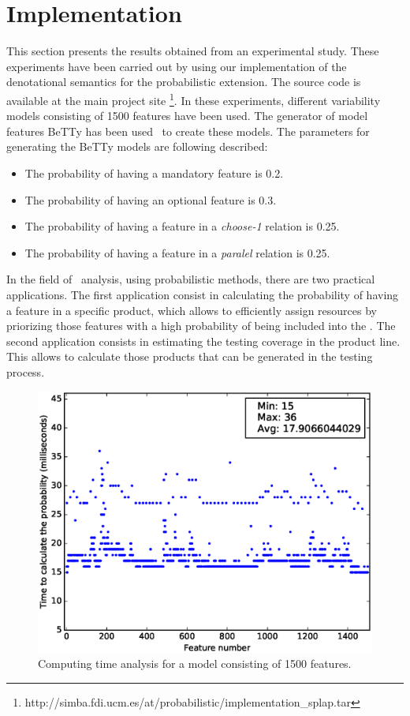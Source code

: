 
\section{Implementation}
\label{sec:stat:impl}

This section presents the results obtained from an experimental study. These experiments have
been carried out by using our implementation of the denotational semantics for the probabilistic 
extension. The source code is available at the main project site \footnote{http://simba.fdi.ucm.es/at/probabilistic/implementation\_splap.tar}.
In these experiments, different variability models consisting of 1500 features have been used. The generator of model features BeTTy has been used~\cite{SeguraHBC11} to create these models. The parameters for generating the BeTTy models are following 
described:

\begin{itemize}
	\item The probability of having a mandatory feature is 0.2.
	\item The probability of having an optional feature is 0.3.
	\item The probability of having a feature in a \emph{choose-1} relation is 0.25.
	\item The probability of having a feature in a \emph{paralel} relation is 0.25.
\end{itemize}

In the field of \SPLs\ analysis, using probabilistic methods, there are two practical applications. The first
application consist in calculating the probability of having a feature in a specific product, which allows to 
efficiently assign resources by priorizing those features with a high probability of being included into 
the \SPL. The second application consists in estimating the testing coverage in the product line. This 
allows to calculate those products that can be generated in the testing process.

\begin{figure}[h]
	\centering
	\linefigure
	\includegraphics[width=0.8\hsize,angle=0]{plot_probs_times.eps}
	\linefigure
	\caption{Computing time analysis for a model consisting of 1500 features.}\label{fig:plot:probs:times}
\end{figure}

